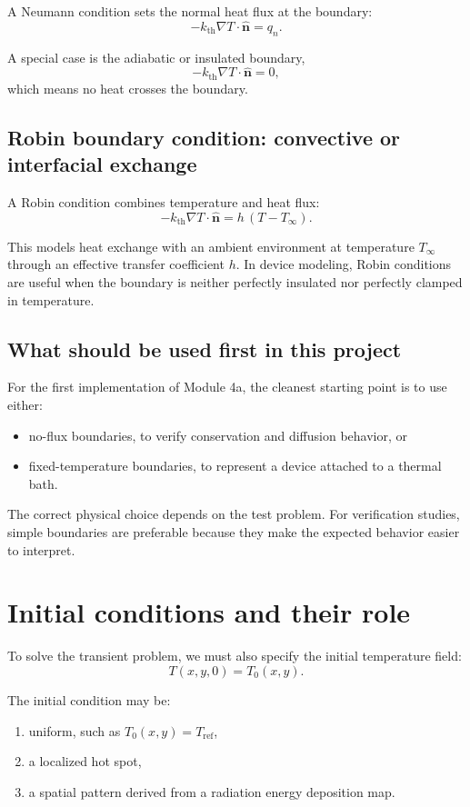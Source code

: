 \documentclass[11pt]{article}
\newcommand{\nvec}{\hat{\mathbf{n}}}
\newcommand{\kth}{k_{\mathrm{th}}}
\begin{document}
A Neumann condition sets the normal heat flux at the boundary:
\[
-\kth \nabla T \cdot \nvec = q_n.
\]

A special case is the adiabatic or insulated boundary,
\[
-\kth \nabla T \cdot \nvec = 0,
\]
which means no heat crosses the boundary.

\subsection{Robin boundary condition: convective or interfacial exchange}

A Robin condition combines temperature and heat flux:
\[
-\kth \nabla T \cdot \nvec = h\,(T - T_\infty).
\]

This models heat exchange with an ambient environment at temperature $T_\infty$ through an effective transfer coefficient $h$. In device modeling, Robin conditions are useful when the boundary is neither perfectly insulated nor perfectly clamped in temperature.

\subsection{What should be used first in this project}

For the first implementation of Module 4a, the cleanest starting point is to use either:
\begin{itemize}
    \item no-flux boundaries, to verify conservation and diffusion behavior, or
    \item fixed-temperature boundaries, to represent a device attached to a thermal bath.
\end{itemize}

The correct physical choice depends on the test problem. For verification studies, simple boundaries are preferable because they make the expected behavior easier to interpret.

\section{Initial conditions and their role}

To solve the transient problem, we must also specify the initial temperature field:
\[
T(x,y,0) = T_0(x,y).
\]

The initial condition may be:
\begin{enumerate}[label=\arabic*.]
    \item uniform, such as $T_0(x,y)=T_{\mathrm{ref}}$,
    \item a localized hot spot,
    \item a spatial pattern derived from a radiation energy deposition map.
\end{enumerate}
\end{document}
